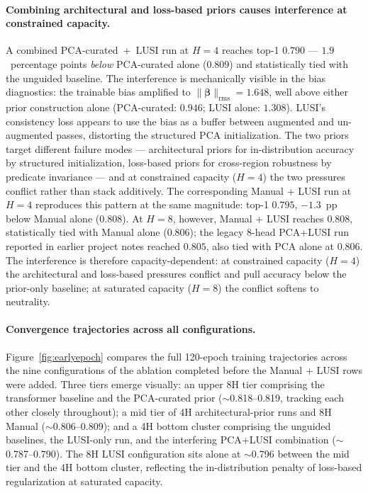 \documentclass[preprint,12pt]{elsarticle}
\begin{document}
\paragraph{Combining architectural and loss-based priors causes interference at constrained capacity.}
A combined PCA-curated~+~LUSI run at $H = 4$ reaches top-1 $0.790$ --- $1.9$~percentage points \emph{below} PCA-curated alone ($0.809$) and statistically tied with the unguided baseline. The interference is mechanically visible in the bias diagnostics: the trainable bias amplified to $\|\bm{\beta}\|_{\text{rms}} = 1.648$, well above either prior construction alone (PCA-curated: $0.946$; LUSI alone: $1.308$). LUSI's consistency loss appears to use the bias as a buffer between augmented and un-augmented passes, distorting the structured PCA initialization. The two priors target different failure modes --- architectural priors for in-distribution accuracy by structured initialization, loss-based priors for cross-region robustness by predicate invariance --- and at constrained capacity ($H = 4$) the two pressures conflict rather than stack additively. The corresponding Manual + LUSI run at $H = 4$ reproduces this pattern at the same magnitude: top-1 $0.795$, $-1.3$~pp below Manual alone ($0.808$). At $H = 8$, however, Manual + LUSI reaches $0.808$, statistically tied with Manual alone ($0.806$); the legacy 8-head PCA+LUSI run reported in earlier project notes reached $0.805$, also tied with PCA alone at $0.806$. The interference is therefore capacity-dependent: at constrained capacity ($H = 4$) the architectural and loss-based pressures conflict and pull accuracy below the prior-only baseline; at saturated capacity ($H = 8$) the conflict softens to neutrality.

\paragraph{Convergence trajectories across all configurations.}
Figure~\ref{fig:earlyepoch} compares the full 120-epoch training trajectories across the nine configurations of the ablation completed before the Manual + LUSI rows were added. Three tiers emerge visually: an upper 8H tier comprising the transformer baseline and the PCA-curated prior ($\sim$0.818--0.819, tracking each other closely throughout); a mid tier of 4H architectural-prior runs and 8H Manual ($\sim$0.806--0.809); and a 4H bottom cluster comprising the unguided baselines, the LUSI-only run, and the interfering PCA+LUSI combination ($\sim$0.787--0.790). The 8H LUSI configuration sits alone at $\sim$0.796 between the mid tier and the 4H bottom cluster, reflecting the in-distribution penalty of loss-based regularization at saturated capacity.
\end{document}
